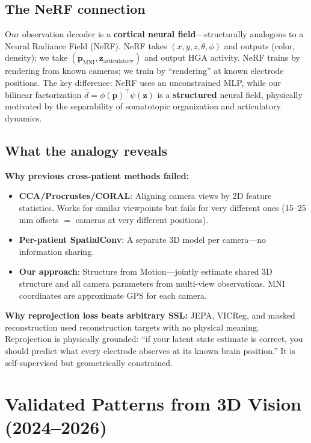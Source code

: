 \documentclass[11pt,letterpaper]{article}
\newcommand{\bfp}{\mathbf{p}}
\newcommand{\bfz}{\mathbf{z}}
\begin{document}
\subsection{The NeRF connection}

Our observation decoder is a \textbf{cortical neural field}---structurally analogous to a Neural Radiance Field (NeRF). NeRF takes $(x,y,z,\theta,\phi)$ and outputs (color, density); we take $(\bfp_{\text{MNI}}, \bfz_{\text{articulatory}})$ and output HGA activity. NeRF trains by rendering from known cameras; we train by ``rendering'' at known electrode positions. The key difference: NeRF uses an unconstrained MLP, while our bilinear factorization $\hat{d} = \phi(\bfp)^\top \psi(\bfz)$ is a \textbf{structured} neural field, physically motivated by the separability of somatotopic organization and articulatory dynamics.

\subsection{What the analogy reveals}

\textbf{Why previous cross-patient methods failed:}
\begin{itemize}[leftmargin=2em]
\item \textbf{CCA/Procrustes/CORAL}: Aligning camera views by 2D feature statistics. Works for similar viewpoints but fails for very different ones (15--25\,mm offsets $=$ cameras at very different positions).
\item \textbf{Per-patient SpatialConv}: A separate 3D model per camera---no information sharing.
\item \textbf{Our approach}: Structure from Motion---jointly estimate shared 3D structure and all camera parameters from multi-view observations. MNI coordinates are approximate GPS for each camera.
\end{itemize}

\textbf{Why reprojection loss beats arbitrary SSL:} JEPA, VICReg, and masked reconstruction used reconstruction targets with no physical meaning. Reprojection is physically grounded: ``if your latent state estimate is correct, you should predict what every electrode observes at its known brain position.'' It is self-supervised but geometrically constrained.


\section{Validated Patterns from 3D Vision (2024--2026)}
\end{document}
